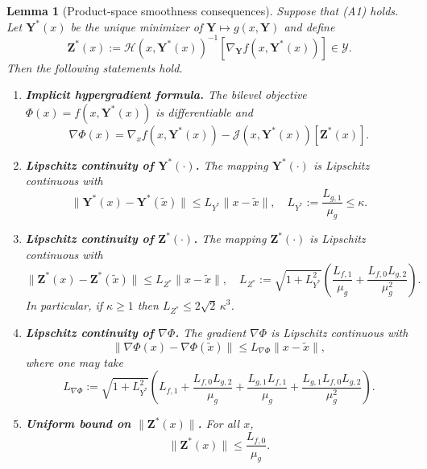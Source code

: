 \documentclass[10pt,a4paper]{amsart}
\newtheorem{lemma}{Lemma}
\newcommand{\Phiobj}{\Phi}
\begin{document}
\begin{lemma}[Product-space smoothness consequences]\label{lem:smoothness_consequences}
Suppose that \emph{(A1)} holds. Let $\boldsymbol Y^*(x)$ be the unique minimizer of $\boldsymbol Y\mapsto g(x,\boldsymbol Y)$ and define
\begin{equation}\label{eq:def_Zstar}
\boldsymbol Z^*(x):=\mathcal H(x,\boldsymbol Y^*(x))^{-1}[\nabla_{\boldsymbol Y}f(x,\boldsymbol Y^*(x))]\in\mathcal Y.
\end{equation}
Then the following statements hold.
\begin{enumerate}
\item \textbf{Implicit hypergradient formula.}
The bilevel objective $\Phiobj(x)=f(x,\boldsymbol Y^*(x))$ is differentiable and
\begin{equation}\label{eq:hypergrad_formula}
\nabla\Phiobj(x)=\nabla_x f(x,\boldsymbol Y^*(x))-\mathcal J(x,\boldsymbol Y^*(x))[\boldsymbol Z^*(x)].
\end{equation}

\item \textbf{Lipschitz continuity of $\boldsymbol Y^*(\cdot)$.}
The mapping $\boldsymbol Y^*(\cdot)$ is Lipschitz continuous with
\begin{equation}\label{eq:LY_star}
\|\boldsymbol Y^*(x)-\boldsymbol Y^*(\tilde x)\|\le L_{Y^*}\|x-\tilde x\|,
\quad
L_{Y^*}:=\frac{L_{g,1}}{\mu_g}\le \kappa.
\end{equation}

\item \textbf{Lipschitz continuity of $\boldsymbol Z^*(\cdot)$.}
The mapping $\boldsymbol Z^*(\cdot)$ is Lipschitz continuous with
\begin{equation}\label{eq:LZ_star}
\|\boldsymbol Z^*(x)-\boldsymbol Z^*(\tilde x)\|
\le L_{Z^*}\|x-\tilde x\|,
\quad
L_{Z^*}:=\sqrt{1+L_{Y^*}^2}\left(\frac{L_{f,1}}{\mu_g}+\frac{L_{f,0}L_{g,2}}{\mu_g^2}\right).
\end{equation}
In particular, if $\kappa\ge 1$ then $L_{Z^*}\le 2\sqrt{2}\,\kappa^3$.

\item \textbf{Lipschitz continuity of $\nabla\Phiobj$.}
The gradient $\nabla\Phiobj$ is Lipschitz continuous with
\begin{equation}\label{eq:Lnabla_Phi}
\|\nabla\Phiobj(x)-\nabla\Phiobj(\tilde x)\|
\le L_{\nabla\Phi}\|x-\tilde x\|,
\end{equation}
where one may take
\begin{equation}\label{eq:Lnabla_Phi_expr}
L_{\nabla\Phi}:=
\sqrt{1+L_{Y^*}^2}\left(
L_{f,1}+\frac{L_{f,0}L_{g,2}}{\mu_g}
+\frac{L_{g,1}L_{f,1}}{\mu_g}
+\frac{L_{g,1}L_{f,0}L_{g,2}}{\mu_g^2}
\right).
\end{equation}

\item \textbf{Uniform bound on $\|\boldsymbol Z^*(x)\|$.}
For all $x$,
\begin{equation}\label{eq:Zstar_bound}
\|\boldsymbol Z^*(x)\|\le \frac{L_{f,0}}{\mu_g}.
\end{equation}
\end{enumerate}
\end{lemma}
\end{document}
